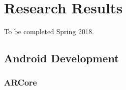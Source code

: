 

\chapter{Research Results}

To be completed Spring 2018.

\section{Android Development}
\subsection{ARCore}

%
%
%
%
